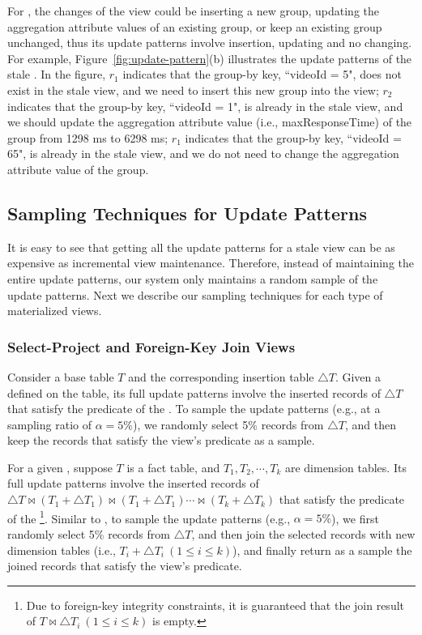 For \aggview, the changes of the view could be inserting a new group, updating the aggregation attribute values of an existing group, or keep an existing group unchanged, thus its update patterns involve insertion, updating and no changing. 
For example, Figure~\ref{fig:update-pattern}(b) illustrates the update patterns of the stale \aggview. In the figure, $r_1$ indicates that the group-by key, ``videoId = 5", does not exist in the stale view, and we need to insert this new group into the view; $r_2$ indicates that the group-by key, ``videoId = 1", is already in the stale view, and we should update the aggregation attribute value (i.e., \textsf{maxResponseTime}) of the group from 1298 ms to 6298 ms; $r_1$ indicates that the group-by key, ``videoId = 65", is already in the stale view, and we do not need to change the aggregation attribute value of the group.    



\subsection{Sampling Techniques for Update Patterns}\label{subsec:sample-pattern}
It is easy to see that getting all the update patterns for a stale view can be as expensive as incremental view maintenance. Therefore, instead of maintaining the entire update patterns, our system only maintains a random sample of the update patterns. Next we describe our sampling techniques for each type of materialized views.

\subsubsection{Select-Project and Foreign-Key Join Views}
Consider a base table $T$ and the corresponding insertion table $\triangle T$. Given a \spview defined on the table, its full update patterns involve the inserted records of $\triangle T$ that satisfy the predicate of the \spview. To sample the update patterns (e.g., at a sampling ratio of $\alpha = 5 \%$), we randomly select 5\% records from $\triangle T$, and then keep the records that satisfy the view's predicate as a sample. 

\sloppy

For a given \fjview, suppose $T$ is a fact table, and $T_1, T_2, \cdots, T_k$ are dimension tables. Its full update patterns involve the inserted records of $\triangle T \bowtie (T_1+\triangle T_1) \bowtie (T_1+\triangle T_1) \cdots \bowtie (T_k+\triangle T_k)$ that satisfy the predicate of the \fjview\footnote{Due to foreign-key integrity constraints, it is guaranteed that the join result of $T \bowtie \triangle T_i ~(1\leq i \leq k)$ is empty.}. Similar to \spview, to sample the update patterns (e.g., $\alpha= 5 \%$), we first randomly select 5\% records from $\triangle T$, and then join the selected records with new dimension tables (i.e., $T_i + \triangle T_i ~(1\leq i \leq k)$), and finally return as a sample the joined records that satisfy the view's predicate. 

